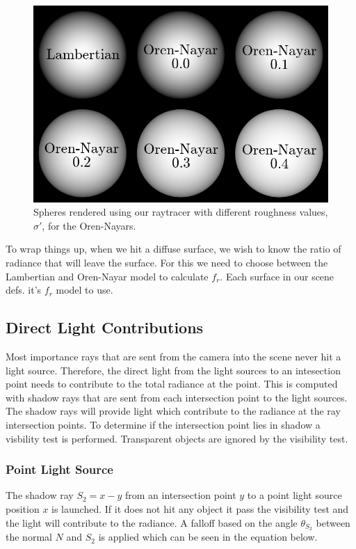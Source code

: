\documentclass[a4paper, twocolumn]{article}
\begin{document}
                \begin{figure}[ht]
                    \centering
                    \includegraphics[width=\linewidth]{share/roughness.png}
                    \caption{Spheres rendered using our raytracer with different roughness values, \(\sigma'\), for the Oren-Nayars.}
                    \label{fig:roughness}
                \end{figure}

                To wrap things up, when we hit a diffuse surface, we wish to know the ratio of radiance that will leave the surface. For this we need to choose between the Lambertian and Oren-Nayar model to calculate \(f_r\). Each surface in our scene defs. it's \(f_r\) model to use.

        \subsection{Direct Light Contributions} \label{sec:direct_light_contributions}
        Most importance rays that are sent from the camera into the scene never hit a light source. Therefore, the direct light from the light sources to an intesection point needs to contribute to the total radiance at the point. This is computed with shadow rays that are sent from each intersection point to the light sources. The shadow rays will provide light which contribute to the radiance at the ray intersection points. To determine if the intersection point lies in shadow a visbility test is performed. Transparent objects are ignored by the visibility test.
            \subsubsection{Point Light Source} \label{sec:point_light_source}
            The shadow ray $S_2 = x - y$ from an intersection point $y$ to a point light source position $x$ is launched. If it does not hit any object it pass the visibility test and the light will contribute to the radiance. A falloff based on the angle $\theta_{S_2}$ between the normal $N$ and $S_2$ is applied which can be seen in the equation below.
\end{document}
